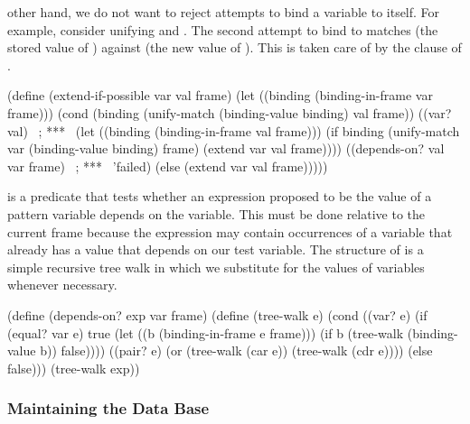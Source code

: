other hand, we do not want to reject attempts to bind a variable to itself.
For example, consider unifying  and .  The second
attempt to bind  to  matches  (the stored value of
) against  (the new value of ).  This is taken care
of by the   clause of .

\begin{codeBlock}
(define (extend-if-possible var val frame)
  (let ((binding (binding-in-frame var frame)))
    (cond (binding
           (unify-match (binding-value binding) val frame))
          ((var? val)                      ~\textrm{; ***}~
           (let ((binding (binding-in-frame val frame)))
             (if binding
                 (unify-match
                  var (binding-value binding) frame)
                 (extend var val frame))))
          ((depends-on? val var frame)     ~\textrm{; ***}~
           'failed)
          (else (extend var val frame)))))
\end{codeBlock}

\noindent
{} is a predicate that tests whether an expression proposed to
be the value of a pattern variable depends on the variable.  This must be done
relative to the current frame because the expression may contain occurrences of
a variable that already has a value that depends on our test variable.  The
structure of  is a simple recursive tree walk in which we
substitute for the values of variables whenever necessary.

\begin{codeBlock}
(define (depends-on? exp var frame)
  (define (tree-walk e)
    (cond ((var? e)
           (if (equal? var e)
               true
               (let ((b (binding-in-frame e frame)))
                 (if b
                     (tree-walk (binding-value b))
                     false))))
          ((pair? e)
           (or (tree-walk (car e))
               (tree-walk (cdr e))))
          (else false)))
  (tree-walk exp))
\end{codeBlock}

\subsubsection{Maintaining the Data Base}
\label{Section 4.4.4.5}

